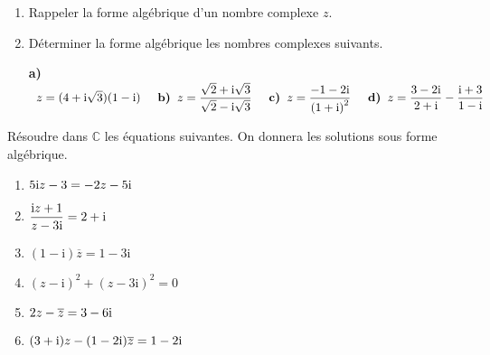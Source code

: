
\everymath{\displaystyle}



\begin{exercice}
\begin{enumerate}
\item Rappeler la forme algébrique d'un nombre complexe $ z $.
\item Déterminer  la  forme algébrique les nombres complexes suivants.

\textbf{a)} $ \;\;z=(4+\text{i}\sqrt{3})(1-\text{i})
\hspace*{0.5cm}\textbf{b)} \;\; z=\dfrac{\sqrt{2}+\text{i}\sqrt{3}}{\sqrt{2}-\text{i}\sqrt{3}} \hspace*{0.5cm}\textbf{c)} \;\; z=\dfrac{-1-2\text{i}}{\left(1+\text{i}\right)^2} 
\hspace*{0.5cm}\textbf{d)} \;\; z=\dfrac{3-2\text{i}}{2+\text{i}}-\dfrac{\text{i}+3}{1-\text{i}} $
\end{enumerate}
\end{exercice}

\begin{exercice}
 Résoudre  dans  $ \mathbb{C} $ les équations suivantes. On donnera les solutions sous forme algébrique.
\begin{enumerate}
\item  $ 5\text{i} z -3=-2z-5\text{i}$
\item  $ \dfrac{\text{i} z+1}{z-3\text{i}}=2+\text{i}$

\item  $ (1-\text{i})\overline{z}=1 -3\text{i}$
\item  $ (z-\text{i})^2 +(z -3\text{i})^2=0$

\item $2z-\overline{z} =3-6\text{i}$
\item $ (3+\text{i})z-(1-2\text{i})\overline{z} =1-2\text{i}$
\end{enumerate}

\end{exercice}

